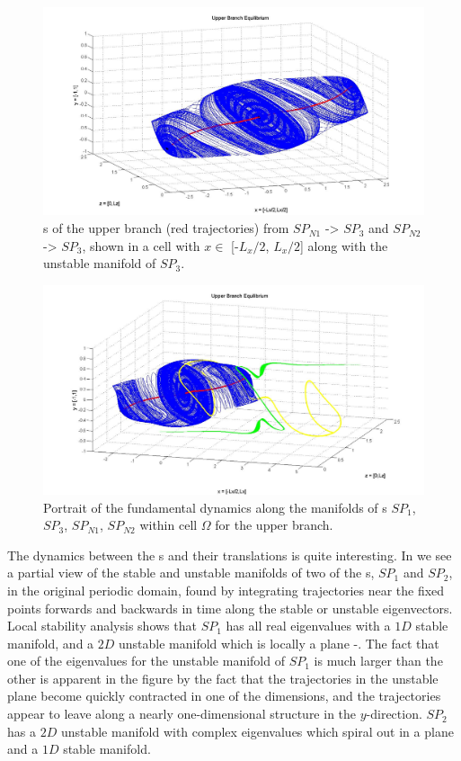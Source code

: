 \documentclass[letter,12pt,openany]{article}
\begin{document}
    \begin{figure}[!h]
\includegraphics[width=1.0\textwidth]{man14_june3.jpg}
  \caption{
{\Hec}s of the upper branch (red trajectories) from 
$SP_{N1}$ -> $SP_3$ and $SP_{N2}$ -> $SP_3$, shown in a cell with $x \in$ 
[-$L_x/2$, $L_x/2$] along with the unstable manifold of $SP_3$. 
   }
  \label{fig:hetero1}
 \end{figure}

  \begin{figure}[!h]
\includegraphics[width=1.1\textwidth]{june4_fig7.jpg}
  \caption{
Portrait of the fundamental dynamics along the manifolds of \stagp s 
$SP_1$, $SP_3$, $SP_{N1}$, $SP_{N2}$ within cell $\Omega$ for the upper 
branch. 
   }
  \label{fig:hetero2}
 \end{figure}

The dynamics between the \stagp s and their translations is quite 
interesting. In  we see a partial view of 
the stable and unstable manifolds of two of the {\stagp}s, $SP_1$ and 
$SP_2$, in the original periodic domain, found by integrating 
trajectories near the fixed points forwards and backwards in time along 
the stable or unstable eigenvectors. Local stability analysis shows that 
$SP_1$ has all real eigenvalues with a $1D$ stable manifold, and a $2D$ 
unstable manifold which is locally a plane 
-. The fact that one of the eigenvalues 
for the unstable manifold of $SP_1$ is much larger than the other is 
apparent in the figure by the fact that the trajectories in the unstable 
plane become quickly contracted in one of the dimensions, and the 
trajectories appear to leave along a nearly one-dimensional structure in 
the $y$-direction. $SP_2$ has a $2D$ unstable manifold with complex 
eigenvalues which spiral out in a plane and a $1D$ stable manifold. 
 
\end{document}
